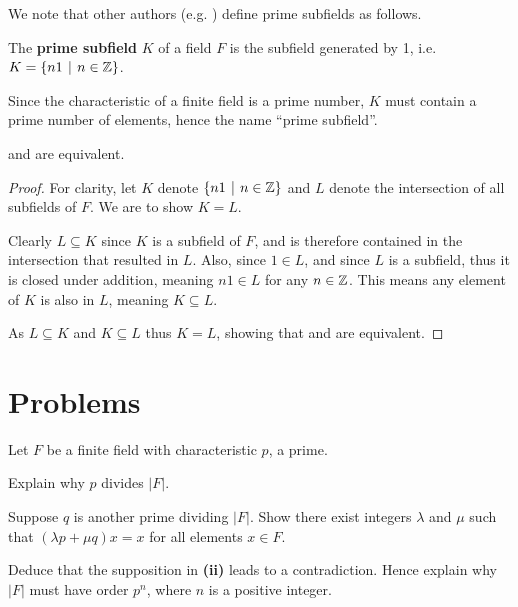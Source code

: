 We note that other authors (e.g. \cite[p.~511]{dummit_foote_2004}) define prime subfields as follows.

\begin{definition}\label{definition-prime-subfield-alt}
    The \textbf{prime subfield} $K$ of a field $F$ is the subfield generated by 1, i.e. $K = \{n1 \vert n \in \Z\}$.
\end{definition}
\begin{remark}
    Since the characteristic of a finite field is a prime number, $K$ must contain a prime number of elements, hence the name ``prime subfield''.
\end{remark}
\begin{theorem}
     and  are equivalent.
\end{theorem}
\begin{proof}
    For clarity, let $K$ denote $\{n1 \vert n \in \Z\}$ and $L$ denote the intersection of all subfields of $F$. We are to show $K = L$.

    Clearly $L \subseteq K$ since $K$ is a subfield of $F$, and is therefore contained in the intersection that resulted in $L$. Also, since $1 \in L$, and since $L$ is a subfield, thus it is closed under addition, meaning $n1 \in L$ for any $n \in \mathbb{Z}$. This means any element of $K$ is also in $L$, meaning $K \subseteq L$.

    As $L \subseteq K$ and $K \subseteq L$ thus $K = L$, showing that  and  are equivalent.
\end{proof}

\newpage

\section{Problems}
\begin{problem}\label{problem-finite-field-has-prime-power-order}
    Let $F$ be a finite field with characteristic $p$, a prime.
    \begin{partquestions}{\roman*}
        \item Explain why $p$ divides $|F|$.
        \item Suppose $q$ is another prime dividing $|F|$. Show there exist integers $\lambda$ and $\mu$ such that $(\lambda p + \mu q)x = x$ for all elements $x \in F$.
        \item Deduce that the supposition in \textbf{(ii)} leads to a contradiction. Hence explain why $|F|$ must have order $p^n$, where $n$ is a positive integer.
    \end{partquestions}
\end{problem}

